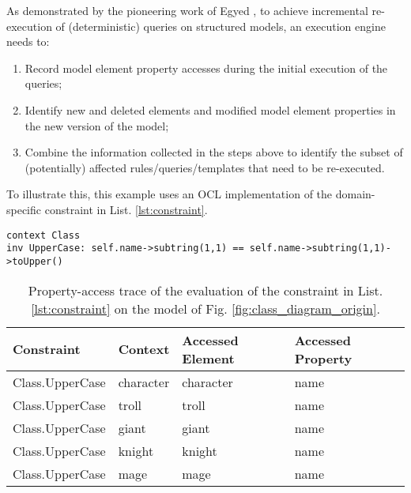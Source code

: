 As demonstrated by the pioneering work of Egyed \cite{egyed2011automatically}, 
to achieve incremental re-execution of (deterministic) queries on 
structured models, an execution engine needs to:

\begin{enumerate}
  \item Record model element property accesses during the initial execution of the queries;
  \item Identify new and deleted elements and modified model element properties in the new version of the model;
  \item Combine the information collected in the steps above to identify the subset of (potentially) affected rules/queries/templates that need to be re-executed.
\end{enumerate}

To illustrate this, this example uses an OCL implementation of the domain-specific constraint in List. \ref{lst:constraint}.

\begin{lstlisting}[style=ocl,caption={OCL constraint requiring that a class should start with an uppercase.},label=lst:constraint]
context Class
inv UpperCase: self.name->subtring(1,1) == self.name->subtring(1,1)->toUpper()
\end{lstlisting}

\begin{table}[ht]
  \centering
  \caption{Property-access trace of the evaluation of the constraint in List. \ref{lst:constraint} on the model of Fig. \ref{fig:class_diagram_origin}.}
  \begin{small}
  \begin{tabular}{p{4cm} p{2.1cm} p{2cm} p{2.1cm}}
    \hline 
    \textbf{Constraint} & \textbf{Context} & \textbf{Accessed Element} & \textbf{Accessed Property} \\ 
    \hline 
    \textsf{Class.UpperCase}  & \textsf{character} & \textsf{character} & \textsf{name} \\ 
    \textsf{Class.UpperCase}  & \textsf{troll} & \textsf{troll} & \textsf{name} \\ 
    \textsf{Class.UpperCase}  & \textsf{giant} & \textsf{giant} & \textsf{name} \\ 
    \textsf{Class.UpperCase}  & \textsf{knight} & \textsf{knight} & \textsf{name} \\
    \textsf{Class.UpperCase}  & \textsf{mage} & \textsf{mage} & \textsf{name} \\
    \hline 
  \end{tabular} 
  \end{small}
  \label{tab:property_access_trace}
\end{table}

